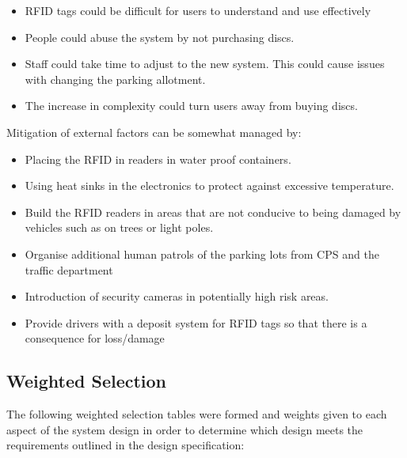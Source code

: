 \begin{itemize}
\item RFID tags could be difficult for users to understand and use effectively
\item People could abuse the system by not purchasing discs.
\item Staff could take time to adjust to the new system. This could cause issues with changing the
parking allotment.
\item The increase in complexity could turn users away from buying discs.
\end{itemize}

Mitigation of external factors can be somewhat managed by:

\begin{itemize}
\item Placing the RFID in readers in water proof containers.
\item Using heat sinks in the electronics to protect against excessive temperature.
\item Build the RFID readers in areas that are not conducive to being damaged by vehicles such as
on trees or light poles.
\item Organise additional human patrols of the parking lots from CPS and the traffic department
\item Introduction of security cameras in potentially high risk areas.
\item Provide drivers with a deposit system for RFID tags so that there is a consequence for
loss/damage
\end{itemize}

\subsection{Weighted Selection}
The following weighted selection tables were formed and weights given to each aspect of the system design in order to determine which design meets the requirements outlined in the design specification:


